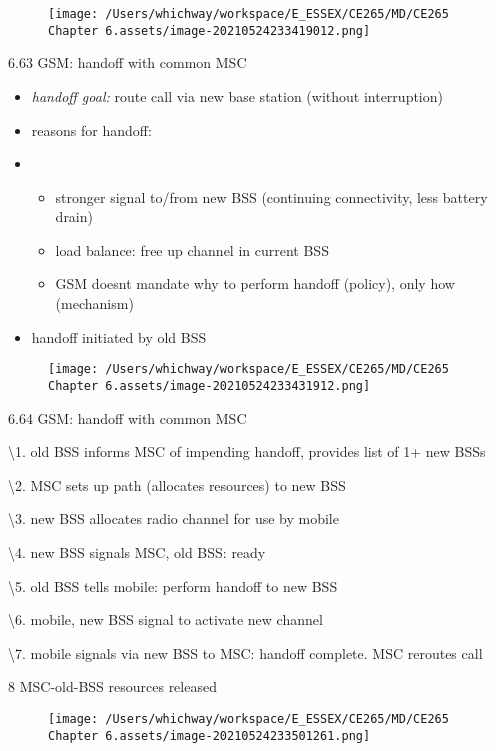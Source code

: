 \documentclass[
]{article}
\begin{document}
\begin{figure}
\centering
\texttt{[image: /Users/whichway/workspace/E\_ESSEX/CE265/MD/CE265 Chapter 6.assets/image-20210524233419012.png]}
\caption{}
\end{figure}

6.63 GSM: handoff with common MSC

\begin{itemize}
\item
  \emph{handoff goal:} route call via new base station (without
  interruption)
\item
  reasons for handoff:
\item
  \begin{itemize}
  \item
    stronger signal to/from new BSS (continuing connectivity, less
    battery drain)
  \item
    load balance: free up channel in current BSS
  \item
    GSM doesnt mandate why to perform handoff (policy), only how
    (mechanism)
  \end{itemize}
\item
  handoff initiated by old BSS
\end{itemize}

\begin{figure}
\centering
\texttt{[image: /Users/whichway/workspace/E\_ESSEX/CE265/MD/CE265 Chapter 6.assets/image-20210524233431912.png]}
\caption{}
\end{figure}

6.64 GSM: handoff with common MSC

\textbackslash1. old BSS informs MSC of impending handoff, provides list
of 1+ new BSSs

\textbackslash2. MSC sets up path (allocates resources) to new BSS

\textbackslash3. new BSS allocates radio channel for use by mobile

\textbackslash4. new BSS signals MSC, old BSS: ready

\textbackslash5. old BSS tells mobile: perform handoff to new BSS

\textbackslash6. mobile, new BSS signal to activate new channel

\textbackslash7. mobile signals via new BSS to MSC: handoff complete.
MSC reroutes call

8 MSC-old-BSS resources released

\begin{figure}
\centering
\texttt{[image: /Users/whichway/workspace/E\_ESSEX/CE265/MD/CE265 Chapter 6.assets/image-20210524233501261.png]}
\caption{}
\end{figure}
\end{document}
